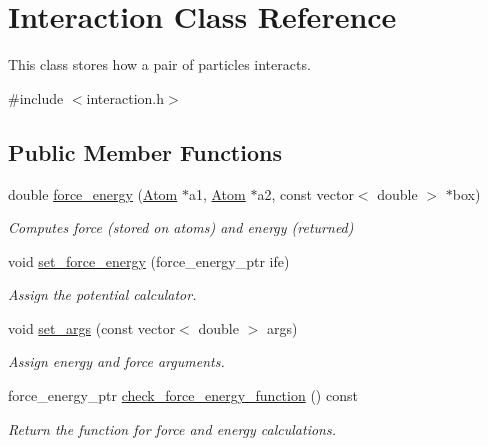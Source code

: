 \hypertarget{classInteraction}{\section{Interaction Class Reference}
\label{classInteraction}
}


This class stores how a pair of particles interacts.  




{\ttfamily \#include $<$interaction.\-h$>$}

\subsection*{Public Member Functions}
\begin{DoxyCompactItemize}
\item 
\hypertarget{classInteraction_ac130c083d3ebb298daa2b65c23bdf6f5}{double \hyperlink{classInteraction_ac130c083d3ebb298daa2b65c23bdf6f5}{force\-\_\-energy} (\hyperlink{structAtom}{Atom} $\ast$a1, \hyperlink{structAtom}{Atom} $\ast$a2, const vector$<$ double $>$ $\ast$box)}\label{classInteraction_ac130c083d3ebb298daa2b65c23bdf6f5}

\begin{DoxyCompactList}\small\item\em Computes force (stored on atoms) and energy (returned) \end{DoxyCompactList}\item 
\hypertarget{classInteraction_a4c47992e9d1f5108bdededb441a2936e}{void \hyperlink{classInteraction_a4c47992e9d1f5108bdededb441a2936e}{set\-\_\-force\-\_\-energy} (force\-\_\-energy\-\_\-ptr ife)}\label{classInteraction_a4c47992e9d1f5108bdededb441a2936e}

\begin{DoxyCompactList}\small\item\em Assign the potential calculator. \end{DoxyCompactList}\item 
\hypertarget{classInteraction_a28f5616df90a267d61bf02d2f767de30}{void \hyperlink{classInteraction_a28f5616df90a267d61bf02d2f767de30}{set\-\_\-args} (const vector$<$ double $>$ args)}\label{classInteraction_a28f5616df90a267d61bf02d2f767de30}

\begin{DoxyCompactList}\small\item\em Assign energy and force arguments. \end{DoxyCompactList}\item 
\hypertarget{classInteraction_a28a9c76d26d78acaf9a8112850b2a1d8}{force\-\_\-energy\-\_\-ptr \hyperlink{classInteraction_a28a9c76d26d78acaf9a8112850b2a1d8}{check\-\_\-force\-\_\-energy\-\_\-function} () const }\label{classInteraction_a28a9c76d26d78acaf9a8112850b2a1d8}

\begin{DoxyCompactList}\small\item\em Return the function for force and energy calculations. \end{DoxyCompactList}\end{DoxyCompactItemize}


